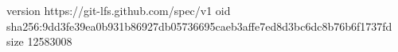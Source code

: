 version https://git-lfs.github.com/spec/v1
oid sha256:9dd3fe39ea0b931b86927db05736695caeb3affe7ed8d3bc6dc8b76b6f1737fd
size 12583008
